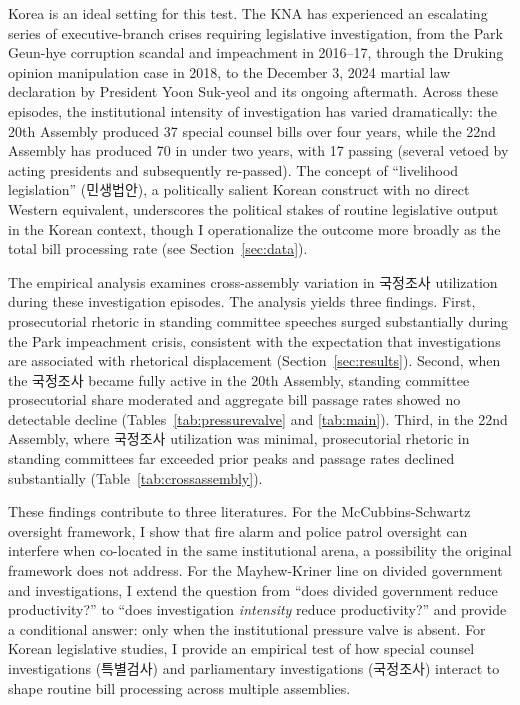 \documentclass[11pt]{article}
\begin{document}
Korea is an ideal setting for this test. The KNA has experienced an escalating series of executive-branch crises requiring legislative investigation, from the Park Geun-hye corruption scandal and impeachment in 2016--17, through the Druking opinion manipulation case in 2018, to the December 3, 2024 martial law declaration by President Yoon Suk-yeol and its ongoing aftermath. Across these episodes, the institutional intensity of investigation has varied dramatically: the 20th Assembly produced 37 special counsel bills over four years, while the 22nd Assembly has produced 70 in under two years, with 17 passing (several vetoed by acting presidents and subsequently re-passed). The concept of ``livelihood legislation'' (민생법안), a politically salient Korean construct with no direct Western equivalent, underscores the political stakes of routine legislative output in the Korean context, though I operationalize the outcome more broadly as the total bill processing rate (see Section~\ref{sec:data}).

The empirical analysis examines cross-assembly variation in 국정조사 utilization during these investigation episodes. The analysis yields three findings. First, prosecutorial rhetoric in standing committee speeches surged substantially during the Park impeachment crisis, consistent with the expectation that investigations are associated with rhetorical displacement (Section~\ref{sec:results}). Second, when the 국정조사 became fully active in the 20th Assembly, standing committee prosecutorial share moderated and aggregate bill passage rates showed no detectable decline (Tables~\ref{tab:pressurevalve} and \ref{tab:main}). Third, in the 22nd Assembly, where 국정조사 utilization was minimal, prosecutorial rhetoric in standing committees far exceeded prior peaks and passage rates declined substantially (Table~\ref{tab:crossassembly}).

These findings contribute to three literatures. For the McCubbins-Schwartz oversight framework, I show that fire alarm and police patrol oversight can interfere when co-located in the same institutional arena, a possibility the original framework does not address. For the Mayhew-Kriner line on divided government and investigations, I extend the question from ``does divided government reduce productivity?'' to ``does investigation \textit{intensity} reduce productivity?'' and provide a conditional answer: only when the institutional pressure valve is absent. For Korean legislative studies, I provide an empirical test of how special counsel investigations (특별검사) and parliamentary investigations (국정조사) interact to shape routine bill processing across multiple assemblies.
\end{document}
